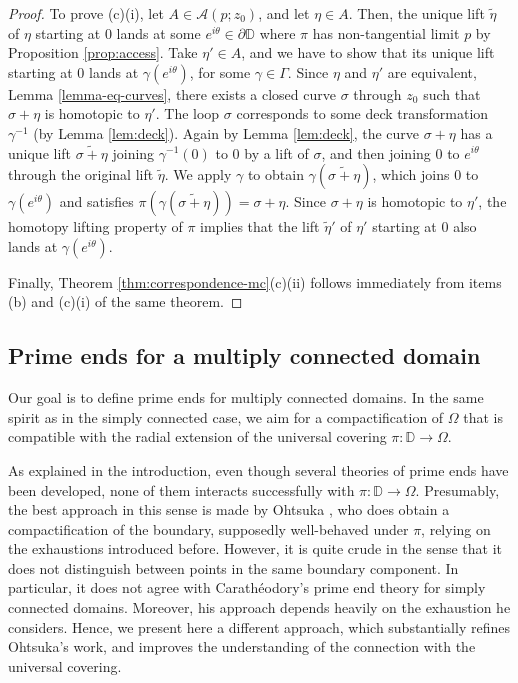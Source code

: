\documentclass[11pt,a4paper,reqno]{amsart}
\theoremstyle{plain}
\theoremstyle{definition}
\theoremstyle{plain}
\def\DD{\mathbb{D}}
\renewcommand{\tilde}{\widetilde}
\begin{document}
\begin{proof}
To prove (c)(i), let $A\in\mathcal{A}(p; z_0)$, and let $\eta\in A$. Then, the unique lift $\tilde\eta$ of $\eta$ starting at $0$ lands at some $e^{i\theta}\in\partial \DD$ where $\pi$ has non-tangential limit $p$ by Proposition \ref{prop:access}. Take $\eta'\in A$, and we have to show that its unique lift starting at $0$ lands at $\gamma(e^{i\theta})$, for some $\gamma\in\Gamma$. Since $ \eta $ and $ \eta '$ are equivalent, Lemma \ref{lemma-eq-curves}, 
there exists   a closed curve $\sigma$ through $z_0$ such that $\sigma + \eta$ is homotopic to $ \eta' $. The loop  $ \sigma $  corresponds to some deck transformation $\gamma^{-1}$ (by Lemma \ref{lem:deck}).  Again by Lemma \ref{lem:deck}, the curve $\sigma + \eta$ has a unique lift $\widetilde{\sigma + \eta}$ joining $\gamma^{-1}(0)$ to $0$ by a lift of $\sigma$, and then joining $0$ to $e^{i\theta}$ through the original lift $\tilde\eta$. We apply $\gamma$ to obtain $\gamma(\widetilde{\sigma + \eta})$, which joins $0$ to $\gamma(e^{i\theta})$ and satisfies $\pi(\gamma(\widetilde{\sigma + \eta})) = \sigma + \eta$. Since $\sigma + \eta$ is homotopic to $\eta'$, the homotopy lifting property of $\pi$ implies that the lift $\tilde\eta'$ of $\eta'$ starting at $0$ also lands at $\gamma(e^{i\theta})$.

Finally, Theorem \ref{thm:correspondence-mc}(c)(ii) follows immediately from items (b) and (c)(i) of the same theorem.
\end{proof}

\subsection{Prime ends for a multiply connected domain}\label{subsect-prime-ends}
Our goal is to define prime ends for multiply connected domains. In the same spirit as in the simply connected case, we aim for a compactification of $ \Omega $ that is compatible with the radial extension of the universal covering $ \pi\colon\mathbb{D}\to \Omega$. 

As explained in the introduction, even though several theories of prime ends have been developed, none of them interacts successfully with $ \pi\colon\mathbb{D}\to \Omega$. Presumably, the best approach in this sense is made by 
Ohtsuka  \cite[Sect. 1]{Oht54}, who does obtain a compactification of the boundary, supposedly well-behaved under $ \pi $, relying on the exhaustions introduced before. However, it is quite crude in the sense that it does not distinguish between points in the same boundary component. In particular, it does not agree with Carathéodory's prime end theory for simply connected domains. Moreover, his approach depends heavily on the exhaustion he considers. Hence, we present here a different approach, which substantially refines Ohtsuka's work, and improves the understanding of the connection with the universal covering.
\end{document}
